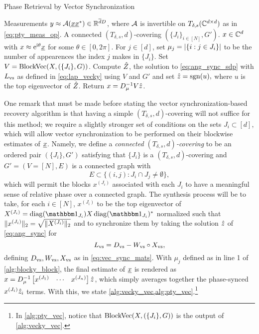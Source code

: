 \begin{algorithm}
\renewcommand{\algorithmicrequire}{\textbf{Input:}}
\renewcommand{\algorithmicensure}{\textbf{Output:}}
\caption{Phase Retrieval by Vector Synchronization}
\label{alg:pty_vec}
\begin{algorithmic}[1]
  \REQUIRE Measurements $y \approx \mathcal{A}(\underline{x} \underline{x}^*) \in \mathbb{R}^{\overline{d} D}$, where $\mathcal{A}$ is invertible on $T_{\delta, s}(\mathbb{C}^{d \times d})$ as in \eqref{eq:pty_meas_op}.  A connected $(T_{\delta, s}, d)$-covering $(\{J_i\}_{i \in [N]}, G')$.
  \ENSURE $x \in \mathbb{C}^d$ with $x \approx \mathrm{e}^{\mathrm{i} \theta} \underline{x}$ for some $\theta \in [0, 2 \pi]$.
  \STATE For $j \in [d]$, set $\mu_j = \lvert\{i : j \in J_i\}\rvert$ to be the number of appearences the index $j$ makes in $\{J_i\}$.
  \STATE Set $V = \operatorname{BlockVec}(X, (\{J_i\}, G))$.
  \STATE Compute $\hat{Z}$, the solution to \eqref{eq:ang_sync_sdp} with $L_{\rm vs}$ as defined in \eqref{eq:lap_vecky} using $V$ and $G'$ and set $\hat{z} = \operatorname{sgn}(u),$ where $u$ is the top eigenvector of $\hat{Z}$.
  \STATE Return $x = D_\mu^{-1} V \hat{z}$.
\end{algorithmic}
\end{algorithm}

One remark that must be made before stating the vector synchronization-based recovery algorithm is that having a simple $(T_{\delta, s}, d)$-covering will not suffice for this method; we require a slightly stronger set of conditions on the sets $J_i \subset [d]$, which will allow vector synchronization to be performed on their blockwise estimates of $\underline{x}$.  Namely, we define a \emph{connected $(T_{\delta, s}, d)$-covering} to be an ordered pair $(\{J_i\}, G')$ satisfying that $\{J_i\}$ is a $(T_{\delta, s}, d)$-covering and $G' = (V = [N], E)$ is a connected graph with \[E \subset \{(i, j) : J_i \cap J_j \neq \emptyset\},\] %
which will permit the blocks $x^{(J_i)}$ associated with each $J_i$ to have a meaningful sense of relative phase over a connected graph.  The synthesis process will be to take, for each $i \in [N]$, $x^{(J_i)}$ to be the top eigenvector of $X^{(J_i)} = \diag(\one_{J_i}) X \diag(\one_{J_i})^*$ normalized such that $\lVert x^{(J_i)}\rVert_2 = \sqrt{\lVert X^{(J_i)}\rVert_2}$ and to synchronize them by taking the solution $\hat{z}$ of \eqref{eq:ang_sync} for \begin{equation} L_{\rm vs} = D_{\rm vs} - W_{\rm vs} \circ X_{\rm vs}, \label{eq:lap_vecky} \end{equation} defining $D_{\rm vs}, W_{\rm vs}, X_{\rm vs}$ as in \eqref{eq:vec_sync_mats}.  With $\mu_j$ defined as in line 1 of \cref{alg:blocky_block}, the final estimate of $\underline{x}$ is rendered as $x = D_\mu^{-1} \begin{bmatrix} x^{(J_1)} & \cdots & x^{(J_n)} \end{bmatrix} \hat{z}$, which simply averages together the phase-synced $x^{(J_i)} \hat{z}_i$ terms.  With this, we state \cref{alg:vecky_vec,alg:pty_vec}.\footnote{In \cref{alg:pty_vec}, notice that $\operatorname{BlockVec}(X, (\{J_i\}, G))$ is the output of \cref{alg:vecky_vec}.}
